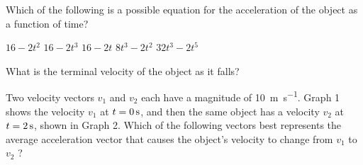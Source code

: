 \documentclass{../../oss-apphys-exam}
\begin{document}
\begin{multicols*}{2}
\begin{questions}

    \question Which of the following is a possible equation for the
    acceleration of the object as a function of time?
    \begin{choices}
      \choice $16-2t^2$
      \choice $16-2t^3$
      \choice $16-2t$
      \choice $8t^3-2t^2$
      \choice $32t^3-2t^5$
    \end{choices}
    \label{q:fall1}
    
    \question What is the terminal velocity of the object as it falls?
    \label{q:fall2}
    \columnbreak
  
    \question Two velocity vectors $v_1$ and $v_2$ each have a magnitude of
    \SI{10}{\metre\per\second}. Graph 1 shows the velocity $v_1$ at
    $t=\SI0\second$, and then the same object has a velocity $v_2$ at
    $t=\SI2\second$, shown in Graph 2. Which of the following vectors best
    represents the average acceleration vector that causes the object's velocity
    to change from $v_1$ to $v_2$ ?
    \begin{center}
      \hspace{.2in}
    \end{center}
    

\end{questions}
\end{multicols*}
\end{document}
